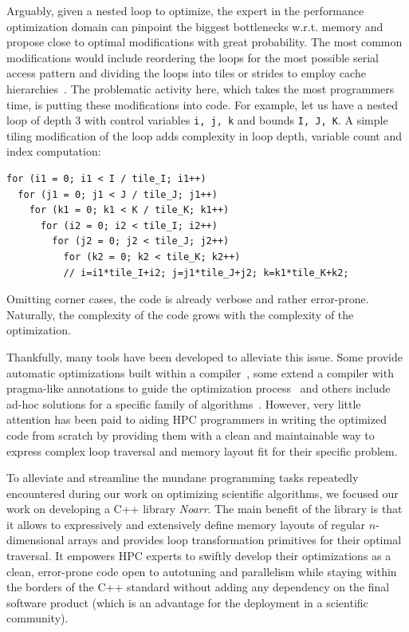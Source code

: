Arguably, given a nested loop to optimize, the expert in the performance optimization domain can pinpoint the biggest bottlenecks w.r.t. memory and propose close to optimal modifications with great probability. The most common modifications would include reordering the loops for the most possible serial access pattern and dividing the loops into tiles or strides to employ cache hierarchies~\cite{wolf1991data}. The problematic activity here, which takes the most programmers time, is putting these modifications into code. For example, let us have a nested loop of depth 3 with control variables \texttt{i, j, k} and bounds \texttt{I, J, K}. A simple tiling modification of the loop adds complexity in loop depth, variable count and index computation: 
\begin{verbatim}
for (i1 = 0; i1 < I / tile_I; i1++)
  for (j1 = 0; j1 < J / tile_J; j1++)
    for (k1 = 0; k1 < K / tile_K; k1++)
      for (i2 = 0; i2 < tile_I; i2++)
        for (j2 = 0; j2 < tile_J; j2++)
          for (k2 = 0; k2 < tile_K; k2++)
          // i=i1*tile_I+i2; j=j1*tile_J+j2; k=k1*tile_K+k2;
\end{verbatim}
Omitting corner cases, the code is already verbose and rather error-prone. Naturally, the complexity of the code grows with the complexity of the optimization.

Thankfully, many tools have been developed to alleviate this issue. Some provide automatic optimizations built within a compiler~\cite{trifunovic2010graphite,grosser2012polly}, some extend a compiler with pragma-like annotations to guide the optimization process~\cite{donadio2005language,yi2007poet,chen2008chill,namjoshi2016loopy} and others include ad-hoc solutions for a specific family of algorithms~\cite{9485033,AFANASYEV2021100707}. However, very little attention has been paid to aiding HPC programmers in writing the optimized code from scratch by providing them with a clean and maintainable way to express complex loop traversal and memory layout fit for their specific problem.

To alleviate and streamline the mundane programming tasks repeatedly encountered during our work on optimizing scientific algorithms, we focused our work on developing a C++ library \emph{Noarr}. The main benefit of the library is that it allows to expressively and extensively define memory layouts of regular $n$-dimensional arrays and provides loop transformation primitives for their optimal traversal. It empowers HPC experts to swiftly develop their optimizations as a clean, error-prone code open to autotuning and parallelism while staying within the borders of the C++ standard without adding any dependency on the final software product (which is an advantage for the deployment in a scientific community).

